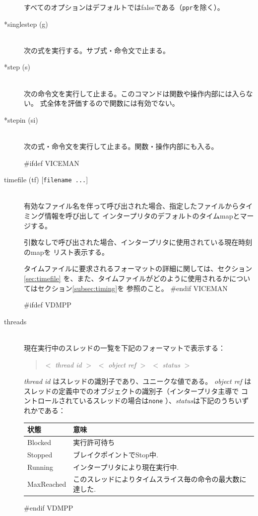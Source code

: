 \documentclass[\pformat,12pt]{article}
\begin{document}
\begin{description}
  すべてのオプションはデフォルトではfalseである（{\tt ppr}を除く）。
 
\item[*singlestep (g)] \mbox{}\\
  次の式を実行する。サブ式・命令文で止まる。

\item[*step (s)] \mbox{}\\
  次の命令文を実行して止まる。このコマンドは関数や操作内部には入らない。
  式全体を評価するので関数には有効でない。

\item[*stepin (si)] \mbox{}\\
  次の式・命令文を実行して止まる。関数・操作内部にも入る。

#ifdef VICEMAN
\item[timefile (tf) \mbox{[{\tt filename ...}]}] \mbox{}\\
  有効なファイル名を伴って呼び出された場合、指定したファイルからタイミング情報を呼び出して
  インタープリタのデフォルトのタイムmapとマージする。

  引数なしで呼び出された場合、インタープリタに使用されている現在時刻のmapを
  リスト表示する。

  タイムファイルに要求されるフォーマットの詳細に関しては、セクション\ref{sec:timefile}
  を、また、タイムファイルがどのように使用されるかについてはセクション\ref{subsec:timing}を
  参照のこと。
#endif VICEMAN

#ifdef VDMPP
\item[threads]\mbox{}\\
現在実行中のスレッドの一覧を下記のフォーマットで表示する：
\begin{quote}
  $<$ \textit{thread id} $>$\ $<$ \textit{object ref} $>$\ $<$
\textit{status} $>$
\end{quote}
\textit{thread id} はスレッドの識別子であり、ユニークな値である。
\textit{object ref} はスレッドの定義中でのオブジェクトの識別子（インタープリタ主導で
コントロールされているスレッドの場合は\texttt{none} ）、\textit{status}は下記のうちいずれかである：

\begin{tabular}{lp{10cm}}\hline
状態 & 意味 \\ \hline
Blocked    & 実行許可待ち \\ 
Stopped    & ブレイクポイントでStop中.\\
Running    & インタープリタにより現在実行中. \\
MaxReached & このスレッドによりタイムスライス毎の命令の最大数に達した. \\ \hline 
\end{tabular}
#endif VDMPP


\end{description}
\end{document}
